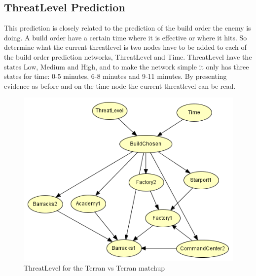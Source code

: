 			
\subsection{ThreatLevel Prediction}
	This prediction is closely related to the prediction of the build order the enemy is doing. A build order have a certain time where it is effective 
	or where it hits. So determine what the current threatlevel is two nodes have to be added to each of the build order prediction networks, 
	ThreatLevel and Time. ThreatLevel have the states Low, Medium and High, and to make the network simple it only has three states for time: 0-5 minutes, 
	6-8 minutes and 9-11 minutes. By presenting evidence as before and on the time node the current threatlevel can be read.
\begin{figure}[H]
	\includegraphics[scale=1]{Figures/BayesianPictures/threatlevel.png}
	\caption{ThreatLevel for the Terran vs Terran matchup}
	\label{fig:threatlevel}
\end{figure}	










 
